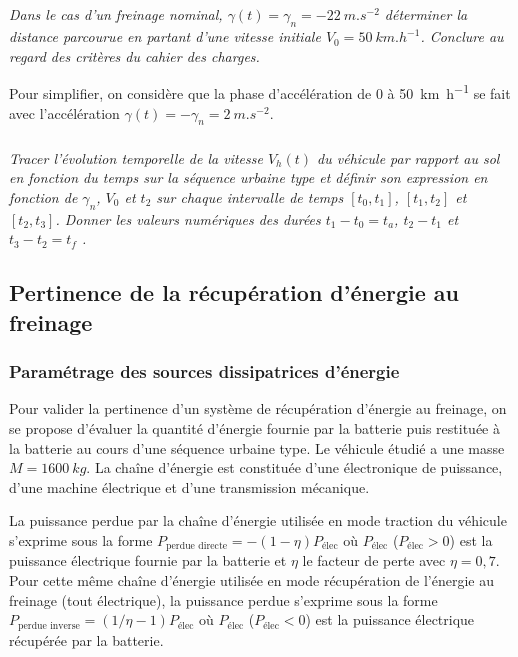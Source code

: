 \documentclass[10pt,fleqn]{article} %
\begin{document}
\begin{multicols}{2}
\subparagraph{}\textit{Dans le cas d'un freinage nominal, $\gamma(t)=\gamma_n=-2\SI{2}{m.s^{-2}}$ déterminer la distance parcourue en partant d'une vitesse initiale $V_0=\SI{50}{km.h^{-1}}$. Conclure au regard des critères du cahier des charges.}
\ifprof
\begin{corrige}
\end{corrige}
\else
\fi


Pour simplifier, on considère que la phase d’accélération de 0 à \SI{50}{km.h^{-1}} se fait avec l’accélération $\gamma(t)=-\gamma_n = \SI{2}{m.s^{-2}}$. 


\subparagraph{}\textit{Tracer l’évolution temporelle de la vitesse $V_h(t)$ du véhicule par rapport au sol en fonction du temps sur la séquence urbaine type et définir son expression en fonction de $\gamma_n$, $V_0$ et $t_2$ sur chaque intervalle de temps $[t_0, t_1]$, $[t_1, t_2]$ et $[t_2, t_3]$. Donner les valeurs numériques des durées $t_1 -t_0 = t_a$, $t_2 - t_1$ et $t_3 - t_2 = t_f$ .}
\ifprof
\begin{corrige}
\end{corrige}
\else
\fi

\subsection*{Pertinence de la récupération d’énergie au freinage}

\subsubsection*{Paramétrage des sources dissipatrices d’énergie}
Pour valider la pertinence d’un système de récupération d’énergie au freinage, on se propose d’évaluer la quantité
d’énergie fournie par la batterie puis restituée à la batterie au cours d’une séquence urbaine type.
Le véhicule étudié a une masse $M = \SI{1600}{kg}$. La chaîne d’énergie est constituée d’une électronique de puissance,
d’une machine électrique et d’une transmission mécanique.

La puissance perdue par la chaîne d’énergie utilisée en mode traction du véhicule s’exprime sous la forme
$P_{\text{perdue directe}} = -(1-\eta)P_{\text {élec}}$ où $P_{\text{élec}}$ ($P_{\text{élec}}>0$) est la puissance électrique fournie par la batterie et $\eta$ le facteur de perte avec $\eta = 0,7$.
Pour cette même chaîne d’énergie utilisée en mode récupération de l’énergie au freinage (tout électrique), la
puissance perdue s’exprime sous la forme $P_{\text{perdue inverse}}= (1/\eta - 1)P_{\text{élec}}$
où $P_{\text{élec}}$ ($P_{\text{élec}}<0$) est la puissance électrique récupérée par la batterie.


\end{multicols}
\end{document}
